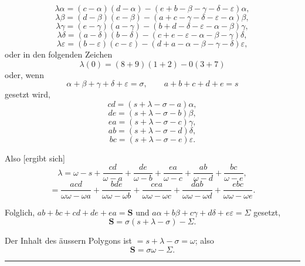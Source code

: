 
\[
\lambda\alpha=(c-\alpha)(d-\alpha)-(e+b-\beta-\gamma-\delta-\varepsilon)\alpha,
\]
\[
\lambda \beta=(d-\beta)(e-\beta)-(a+c-\gamma-\delta-\varepsilon-\alpha)\beta,
\]
\[
\lambda \gamma=(e-\gamma)(a-\gamma)-(b+d-\delta-\varepsilon-\alpha-\beta)\gamma,
\]
\[
\lambda \delta=(a-\delta)(b-\delta)-(c+e-\varepsilon-\alpha-\beta-\gamma)\delta,
\]
\[
\lambda \varepsilon=(b-\varepsilon)(c-\varepsilon)-(d+a-\alpha-\beta-\gamma-\delta)\varepsilon,
\]
oder in den folgenden Zeichen
\[
\lambda(0)=(8+9)(1+2)-0(3+7)
\]
oder, wenn
\[
\alpha+\beta+\gamma+\delta+\varepsilon=\sigma, \qquad a+b+c+d+e=s
\]
gesetzt wird,
\[
cd=(s+\lambda-\sigma-a)\alpha,
\]
\[
de=(s+\lambda-\sigma-b)\beta,
\]
\[
ea=(s+\lambda-\sigma-c)\gamma,
\]
\[
ab=(s+\lambda-\sigma-d)\delta,
\]
\[
bc=(s+\lambda-\sigma-e)\varepsilon.
\]

Also [ergibt sich]
\[
\lambda=\omega-s+\frac{cd}{\omega-a}+\frac{de}{\omega-b}+\frac{ea}{\omega-c}+\frac{ab}{\omega-d}+\frac{bc}{\omega-e},
\]
\[
=\frac{acd}{\omega\omega-\omega a}+\frac{bde}{\omega\omega-\omega b}+\frac{cea}{\omega\omega-\omega c}+\frac{dab}{\omega\omega-\omega d}+\frac{ebc}{\omega\omega-\omega e}.
\]

Folglich, $ab+bc+cd+de+ea=\boldsymbol{S}$ und $a\alpha+b\beta+c\gamma+d\delta+e\varepsilon=\Sigma$ gesetzt,
\[
\boldsymbol{S}=\sigma(s+\lambda-\sigma)-\Sigma.
\]

Der Inhalt des äussern Polygons ist $=s+\lambda-\sigma=\omega$; also
\[
\boldsymbol{S}=\sigma\omega-\Sigma.
\]

\begin{center}\rule{3cm}{.4pt}\end{center}

